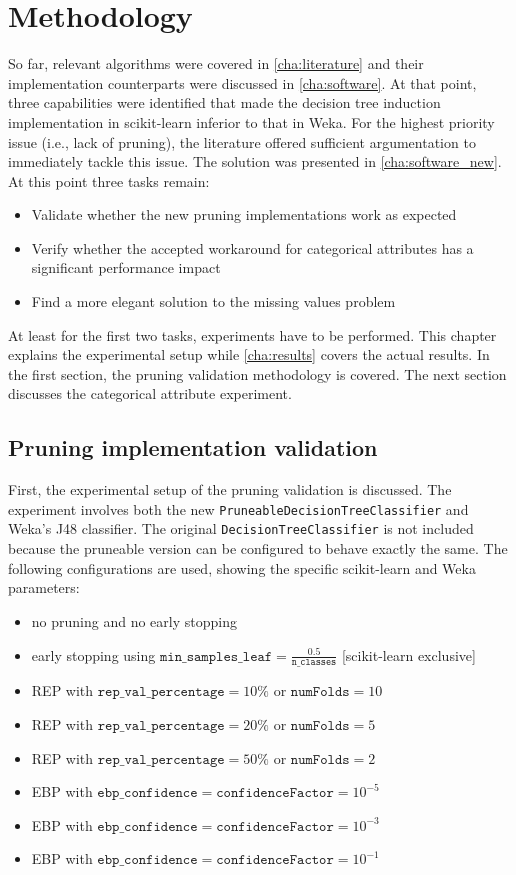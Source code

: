 \chapter{Methodology}\label{cha:method}
So far, relevant algorithms were covered in \autoref{cha:literature} and their implementation counterparts were discussed in \autoref{cha:software}. At that point, three capabilities were identified that made the decision tree induction implementation in scikit-learn inferior to that in Weka. For the highest priority issue (i.e., lack of pruning), the literature offered sufficient argumentation to immediately tackle this issue. The solution was presented in \autoref{cha:software_new}. At this point three tasks remain:
\begin{itemize}
    \item Validate whether the new pruning implementations work as expected
    \item Verify whether the accepted workaround for categorical attributes has a significant performance impact
    \item Find a more elegant solution to the missing values problem
\end{itemize}

At least for the first two tasks, experiments have to be performed. This chapter explains the experimental setup while \autoref{cha:results} covers the actual results. In the first section, the pruning validation methodology is covered. The next section discusses the categorical attribute experiment.

\section{Pruning implementation validation}
First, the experimental setup of the pruning validation is discussed. The experiment involves both the new \texttt{PruneableDecisionTreeClassifier} and Weka's J48 classifier. The original \texttt{DecisionTreeClassifier} is not included because the pruneable version can be configured to behave exactly the same. The following configurations are used, showing the specific scikit-learn and Weka parameters:

\begin{itemize}
    \item no pruning and no early stopping
    \item early stopping using $\texttt{min\_samples\_leaf} = \frac{0.5}{\texttt{n\_classes}}$ [scikit-learn exclusive]
    \item REP with $\texttt{rep\_val\_percentage} = 10\%$ or $\texttt{numFolds} = 10$
    \item REP with $\texttt{rep\_val\_percentage} = 20\%$ or $\texttt{numFolds} = 5$
    \item REP with $\texttt{rep\_val\_percentage} = 50\%$ or $\texttt{numFolds} = 2$
    \item EBP with $\texttt{ebp\_confidence} = \texttt{confidenceFactor} = 10^{-5}$
    \item EBP with $\texttt{ebp\_confidence} = \texttt{confidenceFactor} = 10^{-3}$
    \item EBP with $\texttt{ebp\_confidence} = \texttt{confidenceFactor} = 10^{-1}$
\end{itemize}

